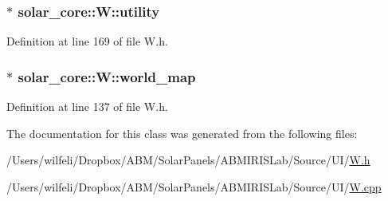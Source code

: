\hypertarget{classsolar__core_1_1_w_a6d6fa51d4bdc40dac8b76aa4967030b5}{}
\subsubsection[{utility}]{$\ast$ solar\+\_\+core\+::\+W\+::utility}\label{classsolar__core_1_1_w_a6d6fa51d4bdc40dac8b76aa4967030b5}


Definition at line 169 of file W.\+h.

\hypertarget{classsolar__core_1_1_w_a8ed6f1aa7fd4ef2c3488147b38a670b7}{}
\subsubsection[{world\+\_\+map}]{$\ast$ solar\+\_\+core\+::\+W\+::world\+\_\+map}\label{classsolar__core_1_1_w_a8ed6f1aa7fd4ef2c3488147b38a670b7}


Definition at line 137 of file W.\+h.



The documentation for this class was generated from the following files\+:\begin{DoxyCompactItemize}
\item 
/\+Users/wilfeli/\+Dropbox/\+A\+B\+M/\+Solar\+Panels/\+A\+B\+M\+I\+R\+I\+S\+Lab/\+Source/\+U\+I/\hyperlink{_w_8h}{W.\+h}\item 
/\+Users/wilfeli/\+Dropbox/\+A\+B\+M/\+Solar\+Panels/\+A\+B\+M\+I\+R\+I\+S\+Lab/\+Source/\+U\+I/\hyperlink{_w_8cpp}{W.\+cpp}\end{DoxyCompactItemize}
